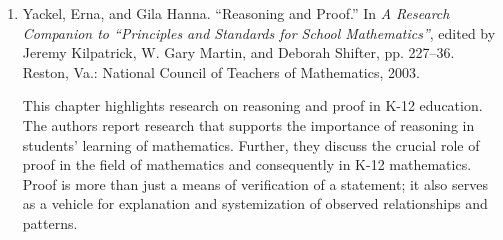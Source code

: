 {{\begin{enumerate}
          \par\noindent\hspace*{1em} In this study looking at secondary school mathematics teachers' conception of proof, Knuth presents a framework for understanding the role of proof in school mathematics. This framework draws on other research and provides a useful way of thinking about the purposes of proof in mathematics curricula. In terms of Knuth's framework, proof is a mechanism for verifying and explaining true statements, communicating mathematically, creating and discovering new mathematics, and organizing ideas so that they are part of a structure of axioms.\vspace{1.35\baselineskip}

        \item Yackel, Erna, and Gila Hanna. ``Reasoning and Proof.'' In \emph{A Research Companion to ``Principles and Standards for School Mathematics''}, edited by Jeremy Kilpatrick, W. Gary Martin, and Deborah Shifter, pp. 227--36. Reston, Va.: National Council of Teachers of Mathematics, 2003.\vspace{.25\baselineskip}

          \par\noindent\hspace*{1em} This chapter highlights research on reasoning and proof in K-12 education. The authors report research that supports the importance of reasoning in students' learning of mathematics. Further, they discuss the crucial role of proof in the field of mathematics and consequently in K-12 mathematics. Proof is more than just a means of verification of a statement; it also serves as a vehicle for explanation and systemization of observed relationships and patterns.
      \end{enumerate}}
  }
